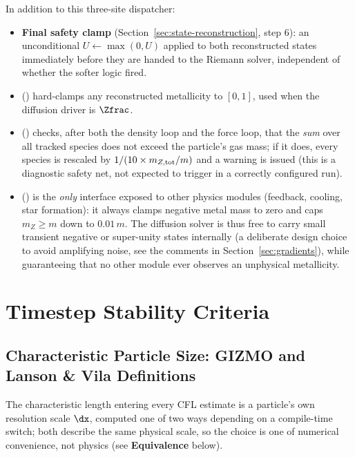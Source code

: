 In addition to this three-site dispatcher:
\begin{itemize}
  \item \textbf{Final safety clamp} (Section~\ref{sec:state-reconstruction},
        step 6): an unconditional
        $U \gets \max(0,U)$ applied to both reconstructed states
        immediately before they are handed to the Riemann solver,
        independent of whether the softer  logic fired.
  \item {}
        () hard-clamps any
        reconstructed metallicity to $[0,1]$, used when the diffusion
        driver is $\Zfrac$.
  \item {}
        () checks, after both the
        density loop and the force loop, that the \emph{sum} over all
        tracked species does not exceed the particle's gas mass; if it
        does, every species is rescaled by $1/(10\times m_{Z,\rm
        tot}/m)$ and a warning is issued (this is a diagnostic
        safety net, not expected to trigger in a correctly configured
        run).
  \item {}
        () is the \emph{only} interface
        exposed to other physics modules (feedback, cooling, star
        formation): it always clamps negative metal mass to zero and
        caps $m_Z \geq m$ down to $0.01\,m$. The diffusion solver is
        thus free to carry small transient negative or super-unity
        states internally (a deliberate design choice to avoid
        amplifying noise, see the comments in
        Section~\ref{sec:gradients}), while guaranteeing that no other
        module ever observes an unphysical metallicity.
\end{itemize}

\section{Timestep Stability Criteria}
\label{sec:timestep}

\subsection{Characteristic Particle Size: GIZMO and Lanson \& Vila Definitions}
The characteristic length entering every CFL estimate is a particle's
own resolution scale $\dx$, computed one of two ways depending on a
compile-time switch; both describe the same physical scale, so the
choice is one of numerical convenience, not physics (see
\textbf{Equivalence} below).

